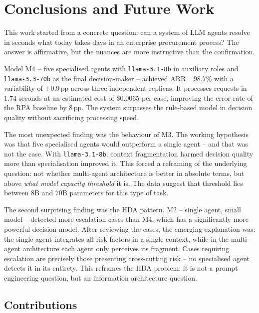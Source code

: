 \documentclass[preprint,12pt,authoryear]{elsarticle}
\begin{document}
\section{Conclusions and Future Work}
\label{sec:conclusions}

This work started from a concrete question: can a system of LLM agents resolve
in seconds what today takes days in an enterprise procurement process?
The answer is affirmative, but the nuances are more instructive than the
confirmation.

Model M4 -- five specialised agents with \texttt{llama-3.1-8b} in auxiliary
roles and \texttt{llama-3.3-70b} as the final decision-maker -- achieved
ARR\,=\,98.7\% with a variability of $\pm$0.9\,pp across three independent
replicas.
It processes requests in 1.74 seconds at an estimated cost of \$0.0065 per
case, improving the error rate of the RPA baseline by 8\,pp.
The system surpasses the rule-based model in decision quality without
sacrificing processing speed.

The most unexpected finding was the behaviour of M3.
The working hypothesis was that five specialised agents would outperform a
single agent -- and that was not the case.
With \texttt{llama-3.1-8b}, context fragmentation harmed decision quality more
than specialisation improved it.
This forced a reframing of the underlying question: not whether multi-agent
architecture is better in absolute terms, but above \emph{what model capacity
threshold} it is.
The data suggest that threshold lies between 8B and 70B parameters for this
type of task.

The second surprising finding was the HDA pattern.
M2 -- single agent, small model -- detected more escalation cases than M4,
which has a significantly more powerful decision model.
After reviewing the cases, the emerging explanation was: the single agent
integrates all risk factors in a single context, while in the multi-agent
architecture each agent only perceives its fragment.
Cases requiring escalation are precisely those presenting cross-cutting risk --
no specialised agent detects it in its entirety.
This reframes the HDA problem: it is not a prompt engineering question, but an
information architecture question.

\subsection{Contributions}
\end{document}
